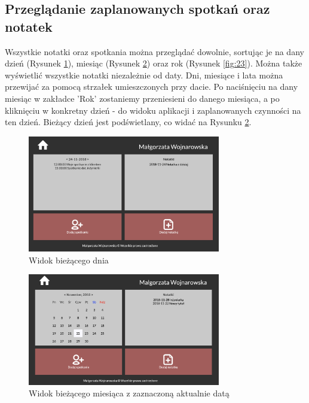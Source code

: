 \documentclass[eng,printmode,openany,oneside]{mgr}
\begin{document}
		
	
	
\newpage
	
	
	
	


\subsection{Przeglądanie zaplanowanych spotkań oraz notatek}
 
Wszystkie notatki oraz spotkania można przeglądać dowolnie, sortując je na dany dzień (Rysunek \ref{fig:21}), miesiąc (Rysunek \ref{fig:22}) oraz rok (Rysunek \ref{fig:23}). Można także wyświetlić wszystkie notatki niezależnie od daty. Dni, miesiące i lata można przewijać za pomocą strzałek umieszczonych przy dacie. Po naciśnięciu na dany miesiąc w zakładce 'Rok' zostaniemy przeniesieni do danego miesiąca, a po kliknięciu w konkretny dzień - do widoku aplikacji i zaplanowanych czynności na ten dzień. Bieżący dzień jest podświetlany, co widać na Rysunku \ref{fig:22}.

	\begin{figure}[H]
		\centering
		\includegraphics[width=0.75\textwidth]{day}
		\caption{Widok bieżącego dnia}
		\label{fig:21}
	\end{figure}

	\begin{figure}[H]
		\centering
		\includegraphics[width=0.75\textwidth]{miesiac}
		\caption{Widok bieżącego miesiąca z zaznaczoną aktualnie datą}
		\label{fig:22}
	\end{figure}
	
\end{document}
